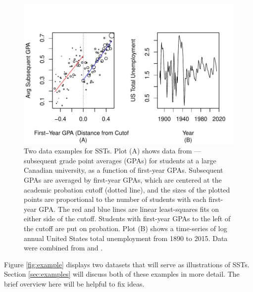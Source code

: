 \documentclass[12pt]{article}\usepackage[]{graphicx}\usepackage[]{color}
\makeatletter
\def\maxwidth{ %
  \ifdim\Gin@nat@width>\linewidth
    \linewidth
  \else
    \Gin@nat@width
  \fi
}
\makeatother
\begin{document}
\begin{figure}

\includegraphics[width=\maxwidth]{figure/examplePlots-1} 

\caption{Two data examples for SSTs. Plot (A) shows data from
  \citet*{lso}---subsequent grade point averages (GPAs) for students
  at a large Canadian university, as a function of first-year
  GPAs. Subsequent GPAs are averaged by first-year GPAs, which are
  centered at the academic probation cutoff (dotted line), and the sizes
  of the plotted points are proportional to the number of students
  with each first-year GPA. The red and blue lines are linear least-squares
  fits on either side of the cutoff. Students with first-year GPAs
  to the left of  the cutoff are put on probation. Plot (B) shows a
  time-series of log annual United States total unemployment from 1890 to
  2015. Data were combined from \citet{urca} and \citet{cps}.}
\label{fig:examples}
\end{figure}


Figure \ref{fig:example} displays two datasets that will serve as
illustrations of SSTs.
Section \ref{sec:examples} will discuss both of these examples in more
detail.
The brief overview here will be helpful to fix ideas.
\end{document}
